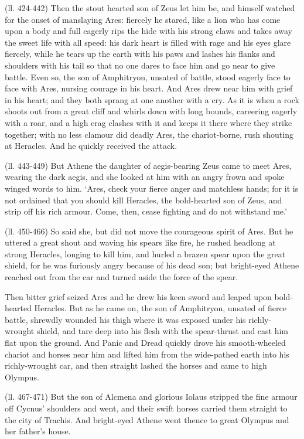(ll. 424-442) Then the stout hearted son of Zeus let him be, and himself
watched for the onset of manslaying Ares: fiercely he stared, like a lion who
has come upon a body and full eagerly rips the hide with his strong claws and
takes away the sweet life with all speed: his dark heart is filled with rage
and his eyes glare fiercely, while he tears up the earth with his paws and
lashes his flanks and shoulders with his tail so that no one dares to face him
and go near to give battle. Even so, the son of Amphitryon, unsated of battle,
stood eagerly face to face with Ares, nursing courage in his heart. And Ares
drew near him with grief in his heart; and they both sprang at one another with
a cry. As it is when a rock shoots out from a great cliff and whirls down with
long bounds, careering eagerly with a roar, and a high crag clashes with it and
keeps it there where they strike together; with no less clamour did deadly
Ares, the chariot-borne, rush shouting at Heracles. And he quickly received the
attack.

(ll. 443-449) But Athene the daughter of aegis-bearing Zeus came to meet Ares,
wearing the dark aegis, and she looked at him with an angry frown and spoke
winged words to him. ‘Ares, check your fierce anger and matchless hands;
for it is not ordained that you should kill Heracles, the bold-hearted son of
Zeus, and strip off his rich armour. Come, then, cease fighting and do not
withstand me.’

(ll. 450-466) So said she, but did not move the courageous spirit of Ares. But
he uttered a great shout and waving his spears like fire, he rushed headlong at
strong Heracles, longing to kill him, and hurled a brazen spear upon the great
shield, for he was furiously angry because of his dead son; but bright-eyed
Athene reached out from the car and turned aside the force of the spear.

Then bitter grief seized Ares and he drew his keen sword and leaped upon
bold-hearted Heracles. But as he came on, the son of Amphitryon, unsated of
fierce battle, shrewdly wounded his thigh where it was exposed under his
richly-wrought shield, and tare deep into his flesh with the spear-thrust and
cast him flat upon the ground. And Panic and Dread quickly drove his
smooth-wheeled chariot and horses near him and lifted him from the wide-pathed
earth into his richly-wrought car, and then straight lashed the horses and came
to high Olympus.

(ll. 467-471) But the son of Alcmena and glorious Iolaus stripped the fine
armour off Cycnus’ shoulders and went, and their swift horses carried
them straight to the city of Trachis. And bright-eyed Athene went thence to
great Olympus and her father’s house.


